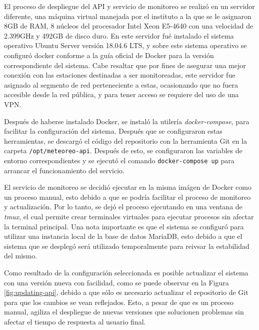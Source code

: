 El proceso de despliegue del API y servicio de monitoreo se realizó en un servidor diferente, una máquina virtual manejada por el instituto a la que se le asignaron 8GB de RAM, 8 núcleos del procesador Intel Xeon E5-4640 con una velocidad de 2.399GHz y 492GB de disco duro. En este servidor fué instalado el sistema operativo Ubuntu Server versión 18.04.6 LTS, y sobre este sistema operativo se configuró docker conforme a la guía oficial de Docker para la versión correspondiente del sistema. Cabe resaltar que por fines de asegurar una mejor conexión con las estaciones destinadas a ser monitoreadas, este servidor fue asignado al segmento de red perteneciente a estas, ocasionando que no fuera accesible desde la red pública, y para tener acceso se requiere del uso de una VPN.

Después de haberse instalado Docker, se instaló la utilería \textit{docker-compose}, para facilitar la configuración del sistema. Después que se configuraron estas herramientas, se descargó el código del repositorio con la herramienta Git en la carpeta \texttt{/opt/meteoreo-api}. Después de esto, se configuraron las variables de entorno correspondientes y se ejecutó el comando \texttt{docker-compose up} para arrancar el funcionamiento del servicio.

El servicio de monitoreo se decidió ejecutar en la misma imágen de Docker como un proceso manual, esto debido a que se podría facilitar el proceso de monitoreo y actualización. Por lo tanto, se dejó el proceso ejecutando en una ventana de \textit{tmux}, el cual permite crear terminales virtuales para ejecutar procesos sin afectar la terminal principal. Una nota importante es que el sistema se configuró para utilizar una instancia local de la base de datos MariaDB, esto debido a que el sistema que se desplegó será utilizado temporalmente para reivsar la estabilidad del mismo.

Como resultado de la configuración seleccionada es posible actualizar el sistema con una versión nueva con facilidad, como se puede observar en la Figura \ref{fig:updating-api}, debido a que sólo es necesario actualizar el repositorio de Git para que los cambios se vean reflejados. Esto, a pesar de que es un proceso manual, agiliza el despliegue de nuevas versiones que solucionen problemas sin afectar el tiempo de respuesta al usuario final.


